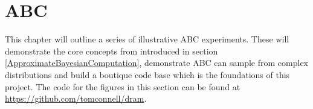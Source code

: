 \chapter{ABC}

This chapter will outline a series of illustrative ABC experiments. These will demonstrate the core concepts from introduced in section \ref{ApproximateBayesianComputation}, demonstrate ABC can sample from complex distributions and build a boutique code base which is the foundations of this project. The code for the figures in this section can be found at \url{https://github.com/tomconnell/dram}.




